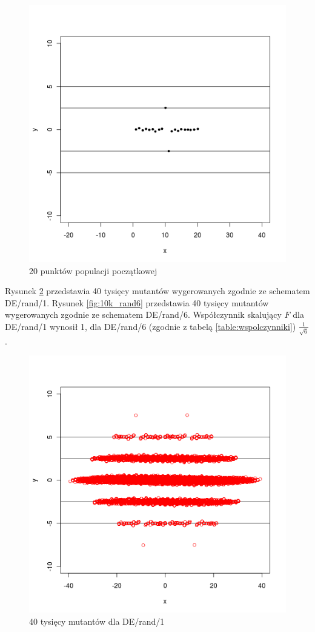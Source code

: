 \documentclass[a4paper,onecolumn,oneside,12pt,wide,floatssmall]{mwrep}
\theoremstyle{definition}
\theoremstyle{plain}%
\theoremstyle{remark}
\begin{document}
\begin{figure}[H]
\centering
\includegraphics[width=.5\textwidth]{img/pop} 
\caption{20 punktów populacji początkowej} 
\label{fig:10k_start}
\end{figure}

Rysunek \ref{fig:10k_rand1} przedstawia 40 tysięcy mutantów wygerowanych zgodnie ze schematem DE/rand/1.
Rysunek \ref{fig:10k_rand6} przedstawia 40 tysięcy mutantów wygerowanych zgodnie ze schematem DE/rand/6.
Współczynnik skalujący $F$ dla 
DE/rand/1 wynosił 1, dla DE/rand/6 (zgodnie z tabelą \ref{table:wspolczynniki}) $\frac{1}{\sqrt{6}}$.

\begin{figure}[H]
\centering
\includegraphics[width=.65\textwidth]{img/rand1}
\caption{40 tysięcy mutantów dla DE/rand/1} 
\label{fig:10k_rand1}
\end{figure}
\end{document}
